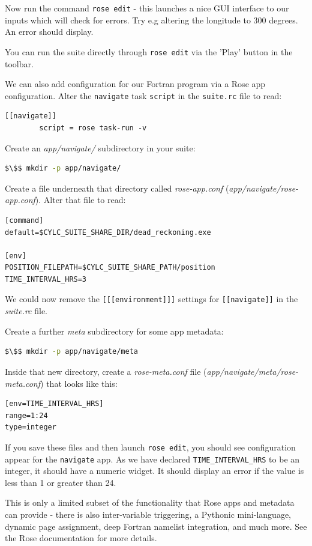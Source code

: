 Now run the command \lstinline{rose edit} - this launches a nice GUI interface to our inputs which will check for errors. Try e.g altering the longitude to 300 degrees. An error should display.

You can run the suite directly through \lstinline{rose edit} via the 'Play' button in the toolbar.

We can also add configuration for our Fortran program via a Rose app configuration. Alter the \lstinline{navigate} task \lstinline{script} in the \lstinline{suite.rc} file to read:
\lstset{language=suiterc}
\begin{lstlisting}[columns=fullflexible]
    [[navigate]]
        script = rose task-run -v
\end{lstlisting}

Create an {\em app/navigate/} subdirectory in your suite:

\begin{lstlisting}[mathescape, language=bash]
$\$$ mkdir -p app/navigate/
\end{lstlisting}

Create a file underneath that directory called {\em rose-app.conf} ({\em app/navigate/rose-app.conf}). Alter that file to read:

\lstset{language=suiterc}
\begin{lstlisting}[columns=fullflexible]
[command]
default=$CYLC_SUITE_SHARE_DIR/dead_reckoning.exe

[env]
POSITION_FILEPATH=$CYLC_SUITE_SHARE_PATH/position
TIME_INTERVAL_HRS=3
\end{lstlisting}

We could now remove the \lstinline{[[[environment]]]} settings for \lstinline{[[navigate]]} in the {\em suite.rc} file.

Create a further {\em meta} subdirectory for some app metadata:

\begin{lstlisting}[mathescape, language=bash]
$\$$ mkdir -p app/navigate/meta
\end{lstlisting}

Inside that new directory, create a {\em rose-meta.conf} file ({\em app/navigate/meta/rose-meta.conf}) that looks like this:

\lstset{language=suiterc}
\begin{lstlisting}[columns=fullflexible]
[env=TIME_INTERVAL_HRS]
range=1:24
type=integer
\end{lstlisting}

If you save these files and then launch \lstinline{rose edit}, you should see configuration appear for the \lstinline{navigate} app. As we have declared \lstinline{TIME_INTERVAL_HRS} to be an integer, it should have a numeric widget. It should display an error if the value is less than 1 or greater than 24.

This is only a limited subset of the functionality that Rose apps and metadata can provide - there is also inter-variable triggering, a Pythonic mini-language, dynamic page assignment, deep Fortran namelist integration, and much more. See the Rose documentation for more details.
